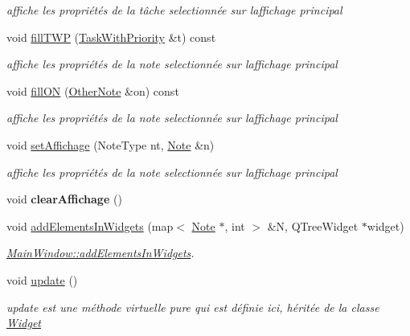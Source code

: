 \begin{DoxyCompactItemize}
\begin{DoxyCompactList}\small\item\em affiche les propriétés de la tâche selectionnée sur l\textquotesingle{}affichage principal \end{DoxyCompactList}\item 
\mbox{\label{classMainWindow_a7512d623741ab1e351f3b67743f228c1}} 
void \hyperlink{classMainWindow_a7512d623741ab1e351f3b67743f228c1}{fill\+T\+WP} (\hyperlink{classTaskWithPriority}{Task\+With\+Priority} \&t) const
\begin{DoxyCompactList}\small\item\em affiche les propriétés de la note selectionnée sur l\textquotesingle{}affichage principal \end{DoxyCompactList}\item 
\mbox{\label{classMainWindow_afeb237449315f413ba2ae5a3841c9f46}} 
void \hyperlink{classMainWindow_afeb237449315f413ba2ae5a3841c9f46}{fill\+ON} (\hyperlink{classOtherNote}{Other\+Note} \&on) const
\begin{DoxyCompactList}\small\item\em affiche les propriétés de la note selectionnée sur l\textquotesingle{}affichage principal \end{DoxyCompactList}\item 
void \hyperlink{classMainWindow_a379d0333137913ea4e2fe46bd123d815}{set\+Affichage} (Note\+Type nt, \hyperlink{classNote}{Note} \&n)
\begin{DoxyCompactList}\small\item\em affiche les propriétés de la note selectionnée sur l\textquotesingle{}affichage principal \end{DoxyCompactList}\item 
\mbox{\label{classMainWindow_adc755852beadb459c938a9162bab8606}} 
void {\bfseries clear\+Affichage} ()
\item 
void \hyperlink{classMainWindow_a40ae3ab77e534e73aefc94d4bdf12ee7}{add\+Elements\+In\+Widgets} (map$<$ \hyperlink{classNote}{Note} $\ast$, int $>$ \&N, Q\+Tree\+Widget $\ast$widget)
\begin{DoxyCompactList}\small\item\em \hyperlink{classMainWindow_a40ae3ab77e534e73aefc94d4bdf12ee7}{Main\+Window\+::add\+Elements\+In\+Widgets}. \end{DoxyCompactList}\item 
void \hyperlink{classMainWindow_a128f71880d4b9683149023fc46fcc9f8}{update} ()
\begin{DoxyCompactList}\small\item\em update est une méthode virtuelle pure qui est définie ici, héritée de la classe \hyperlink{classWidget}{Widget} \end{DoxyCompactList}\end{DoxyCompactItemize}
